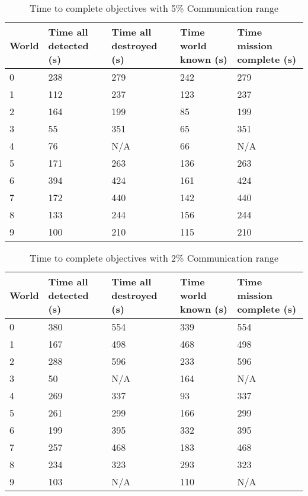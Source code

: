 \begin{table}[H]
	\caption{Time to complete objectives with 5\% Communication range}
	\centering
	\label{tab:comm5}
	
	\begin{tabular}{|p{1cm}|p{1.75cm}|p{1.75cm}|p{1.5cm}|p{2cm}|}
		\hline
		World & Time all detected (s) & Time all destroyed (s) & Time world known (s) & Time mission complete (s) \\
		\hline
		0&238&279&242&279 \\ \hline
		1&112&237&123&237 \\ \hline
		2&164&199&85&199 \\ \hline
		3&55&351&65&351 \\ \hline
		4&76& N/A &66& N/A\\ \hline
		5&171&263&136&263 \\ \hline
		6&394&424&161&424 \\ \hline
		7&172&440&142&440 \\ \hline
		8&133&244&156&244 \\ \hline
		9&100&210&115&210 \\ \hline
	\end{tabular}
\end{table}


\begin{table}[H]
	\caption{Time to complete objectives with 2\% Communication range}
	\centering
	\label{tab:comm2}
	
	\begin{tabular}{|p{1cm}|p{1.75cm}|p{1.75cm}|p{1.5cm}|p{2cm}|}
		\hline
		World & Time all detected (s) & Time all destroyed (s) & Time world known (s) & Time mission complete (s) \\
		\hline
		0&380&554&339&554 \\ \hline
		1&167&498&468&498 \\ \hline
		2&288&596&233&596 \\ \hline
		3&50& N/A &164& N/A\\ \hline
		4&269&337&93&337 \\ \hline
		5&261&299&166&299 \\ \hline
		6&199&395&332&395 \\ \hline
		7&257&468&183&468 \\ \hline
		8&234&323&293&323 \\ \hline
		9&103& N/A &110& N/A\\ \hline
	\end{tabular}
\end{table}

